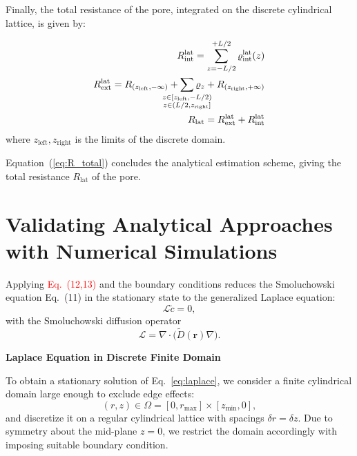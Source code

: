 \documentclass[10pt, a4paper, twocolumn]{article}
\newcommand\todo[1]{\textcolor{red}{#1}}
\begin{document}
Finally, the total resistance of the pore, integrated on the discrete cylindrical lattice, is given by:

\begin{eqnarray}
    R_{\text{int}}^{\text{lat}} = \sum_{z=-L/2}^{+L/2} \varrho_{\text{int}}^{\text{lat}}(z)
    \\
    R_{\text{ext}}^{\text{lat}} = R_{(z_{\text{left}}, -\infty)} + \sum\limits_{\mathclap{\substack{z \in [z_{\text{left}},-L/2)\\z \in (L/2, z_\text{right}]}}} \varrho_{z} + R_{(z_{\text{right}}, +\infty)}
    \\
    \label{eq:R_total}
    R_{\text{lat}} = R_{\text{ext}}^{\text{lat}} + R_{\text{int}}^{\text{lat}}
\end{eqnarray}
where $z_{\text{left}}, z_{\text{right}}$ is the limits of the discrete domain.

Equation~(\ref{eq:R_total}) concludes the analytical estimation scheme, giving the total resistance $R_{\text{lat}}$ of the pore.


\section{Validating Analytical Approaches with Numerical Simulations}


Applying \todo{Eq.~(12,13)} and the boundary conditions reduces the Smoluchowski equation Eq.~(11) in the stationary state to the generalized Laplace equation:
\begin{equation}
  \mathcal L\tilde c=0,
  \label{eq:laplace}
\end{equation}
with the Smoluchowski diffusion operator
\begin{equation*}
  \mathcal L=\nabla\!\cdot\!\bigl(\tilde D(\bm r)\nabla\bigr).
\end{equation*}

\textbf{Laplace Equation in Discrete Finite Domain}

To obtain a stationary solution of Eq.~\eqref{eq:laplace}, we consider a finite cylindrical domain large enough to exclude edge effects:
\begin{equation*}
  (r,z) \in \Omega = [0,r_{\max}]\times[z_{\min},0],
\end{equation*}
and discretize it on a regular cylindrical lattice with spacings $\delta r=\delta z$. 
Due to symmetry about the mid-plane $z = 0$, we restrict the domain accordingly with imposing suitable boundary condition.
\end{document}
